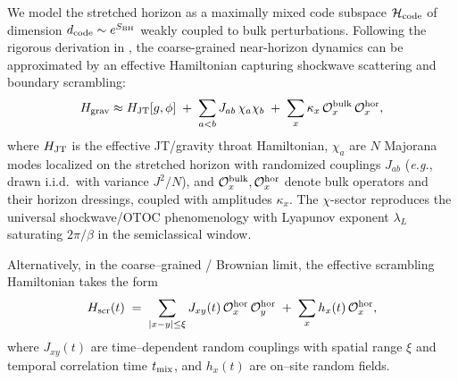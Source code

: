 \documentclass[11pt,a4paper]{article}
\newcommand{\eg}{\textit{e.g.}\xspace}
\theoremstyle{plain}
\theoremstyle{definition}
\theoremstyle{remark}
\begin{document}
We model the stretched horizon as a maximally mixed code subspace $\mathcal{H}_{\rm code}$ of dimension $d_{\rm code}\sim e^{S_{\rm BH}}$ weakly coupled to bulk perturbations. Following the rigorous derivation in , the coarse-grained near-horizon dynamics can be approximated by an effective Hamiltonian capturing shockwave scattering and boundary scrambling:
\begin{equation}
H_{\rm grav}\approx H_{\rm JT}[g,\phi]\;+\;\sum_{a<b} J_{ab}\,\chi_a\chi_b\;+\;\sum_{x}\kappa_x\,\mathcal{O}^{\rm bulk}_x\,\mathcal{O}^{\rm hor}_x,
\label{eq:Hgrav}
\end{equation}
where $H_{\rm JT}$ is the effective JT/gravity throat Hamiltonian, $\chi_a$ are $N$ Majorana modes localized on the stretched horizon with randomized couplings $J_{ab}$ (\eg, drawn i.i.d.\ with variance $J^2/N$), and $\mathcal{O}^{\rm bulk}_x, \mathcal{O}^{\rm hor}_x$ denote bulk operators and their horizon dressings, coupled with amplitudes $\kappa_x$. The $\chi$-sector reproduces the universal shockwave/OTOC phenomenology with Lyapunov exponent $\lambda_L$ saturating $2\pi/\beta$ in the semiclassical window.

Alternatively, in the coarse--grained / Brownian limit, the effective scrambling Hamiltonian takes the form
\begin{equation}
H_{\rm scr}(t)\;=\;\sum_{|x-y|\le \xi} J_{xy}(t)\,\mathcal{O}^{\rm hor}_x\,\mathcal{O}^{\rm hor}_y\;+\;\sum_x h_x(t)\,\mathcal{O}^{\rm hor}_x,
\label{eq:scrambling-ham}
\end{equation}
where $J_{xy}(t)$ are time--dependent random couplings with spatial range $\xi$ and temporal correlation time $t_{\rm mix}$, and $h_x(t)$ are on--site random fields.
 
\end{document}
